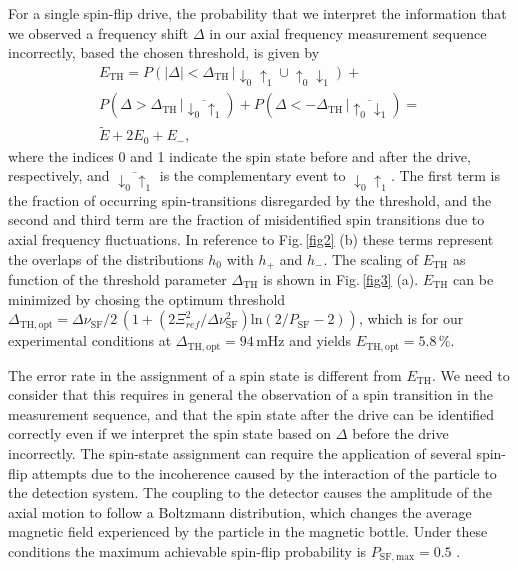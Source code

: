 \documentclass[12pt,preprint%
]{elsarticle}
\begin{document}
For a single spin-flip drive, the probability that we interpret the information that we observed a frequency shift $\Delta$ in our axial frequency measurement sequence incorrectly, based the chosen threshold, is given by 
\begin{eqnarray}
E_{\mathrm{TH}} = P(|\Delta|<\Delta_{\mathrm{TH}}\,|\downarrow_0\uparrow_1\cup\uparrow_0\downarrow_1)+\nonumber\\
 P(\Delta >\Delta_{\mathrm{TH}}\,|\overline{\downarrow_0\uparrow_1}) + P(\Delta < -\Delta_{\mathrm{TH}}\,|\overline{\uparrow_0\downarrow_1})=\nonumber\\
\tilde{E} + 2 E_0 + E_-,
\end{eqnarray}
where the indices 0 and 1 indicate the spin state before and after the drive, respectively, and $\overline{\downarrow_0\uparrow_1}$ is the complementary event to $\downarrow_0\uparrow_1$. The first term is the fraction of occurring spin-transitions disregarded by the threshold, and the second and third term are the fraction of misidentified spin transitions due to axial frequency fluctuations. In reference to Fig.$\,$\ref{fig2} (b) these terms represent the overlaps of the distributions $h_0$ with $h_+$ and $h_-$. The scaling of $E_{\mathrm{TH}}$ as function of the threshold parameter $\Delta_{\mathrm{TH}}$ is shown in Fig.$\,$\ref{fig3} (a). $E_{\mathrm{TH}}$ can be minimized by chosing the optimum threshold $\Delta_{\mathrm{TH,opt}}=\Delta\nu_{\mathrm{SF}}/2\,(1+(2 \Xi_{ref}^2/\Delta\nu_{\mathrm{SF}}^2) \mathrm{ln}(2/P_{\mathrm{SF}}-2))$, which is for our experimental conditions at $\Delta_{\mathrm{TH,opt}} = 94\,$mHz and yields $E_{\mathrm{TH,opt}} = 5.8\,\%$. 

The error rate in the assignment of a spin state is different from $E_{\mathrm{TH}}$. We need to consider that this requires in general the observation of a spin transition in the measurement sequence, and that the spin state after the drive can be identified correctly even if we interpret the spin state based on $\Delta$ before the drive incorrectly. The spin-state assignment can require the application of several spin-flip attempts due to the incoherence caused by the interaction of the particle to the detection system. The coupling to the detector causes the amplitude of the axial motion to follow a Boltzmann distribution, which changes the average magnetic field experienced by the particle in the magnetic bottle. Under these conditions the maximum achievable spin-flip probability is $P_{\mathrm{SF,max}} = 0.5$ \cite{BrownGeoniumLineshape}. 
\end{document}
